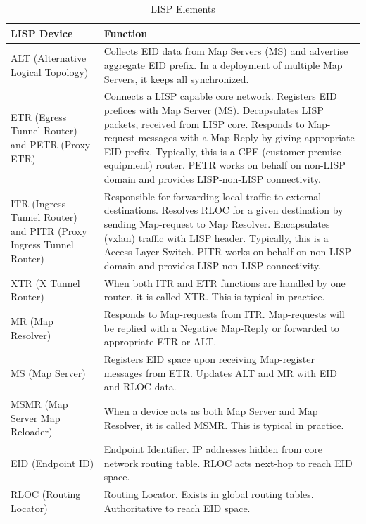 \begin{table}[H]
	\centering
	\begin{tabularx}{\textwidth}{p{6.6cm} | X}
		\rowcolor{gray!50}
		\textbf{LISP Device} & \textbf{Function} \\
		\hline	
		ALT (Alternative Logical Topology) & Collects EID data from Map Servers (MS) and advertise aggregate EID prefix. In a deployment of multiple Map Servers, it keeps all synchronized. \\
		
		ETR (Egress Tunnel Router) and PETR (Proxy ETR) & Connects a LISP capable core network. Registers EID prefices with Map Server (MS). Decapsulates LISP packets, received from LISP core. Responds to Map-request messages with a Map-Reply by giving appropriate EID prefix. Typically, this is a CPE (customer premise equipment) router. PETR works on behalf on non-LISP domain and provides LISP-non-LISP connectivity. \\ 
		
		ITR (Ingress Tunnel Router) and PITR (Proxy Ingress Tunnel Router) & Responsible for forwarding local traffic to external destinations. Resolves RLOC for a given destination by sending Map-request to Map Resolver. Encapsulates (vxlan) traffic with LISP header. Typically, this is a Access Layer Switch. PITR works on behalf on non-LISP domain and provides LISP-non-LISP connectivity. \\
		
		XTR (X Tunnel Router) & When both ITR and ETR functions are handled by one router, it is called XTR. This is typical in practice. \\
		
		MR (Map Resolver) & Responds to Map-requests from ITR. Map-requests will be replied with a Negative Map-Reply or forwarded to appropriate ETR or ALT. \\
		
		MS (Map Server) & Registers EID space upon receiving Map-register messages from ETR. Updates ALT and MR with EID and RLOC data. \\
		
		MSMR (Map Server Map Reloader) & When a device acts as both Map Server and Map Resolver, it is called MSMR. This is typical in practice. \\
		
		EID (Endpoint ID) & Endpoint Identifier. IP addresses hidden from core network routing table. RLOC acts next-hop to reach EID space. \\
		
		RLOC (Routing Locator) & Routing Locator. Exists in global routing tables. Authoritative to reach EID space. \\
		
	\end{tabularx}
	\caption{LISP Elements}
	\label{tab:LISP Elements}
\end{table}

